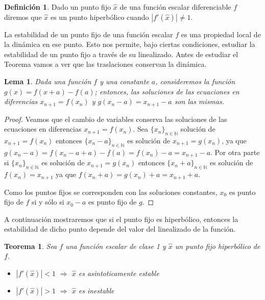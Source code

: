 \documentclass[12pt,a4paper]{report}
\newtheorem{teorema}{Teorema}[section]
\newtheorem{lema}{Lema}[section]
\theoremstyle{definition}
\newtheorem{definicion}{Definición}[section]
\begin{document}
\begin{definicion}

Dado un punto fijo $\hat{x} $ de una función escalar diferenciable $f$ diremos que $\hat{x}$ es un punto hiperbólico cuando $|f'(\hat{x})| \neq 1$.
\end{definicion}

La estabilidad de un punto fijo de una función escalar $f$ es una propiedad local de la dinámica en ese punto. Esto nos permite, bajo ciertas condiciones, estudiar la estabilidad de un punto fijo a través de su linealizado. Antes de estudiar el Teorema vamos a ver que las traslaciones conservan la dinámica.

\begin{lema}
Dada una función $f$ y una constante $a$, consideremos la función $g(x) = f(x + a) - f(a)$; entonces, las soluciones de las ecuaciones en diferencias $x_{n+1} = f(x_n)$ y $g(x_n - a) = x_{n+1} - a$ son las mismas.
    
\end{lema}

\begin{proof}

Veamos que el cambio de variables conserva las soluciones de las ecuaciones en diferencias $x_{n+1} = f(x_n)$. Sea $\{x_n\}_{n\in\mathbb{N}}$ solución de $x_{n+1} = f(x_n)$ entonces $\{x_n-a\}_{n \in \mathbb{N}}$ es solución de $x_{n+1} = g(x_n)$, ya que $g(x_n - a) = f(x_n - a +a) - f(a) = f(x_n) - a = x_{n+1} - a$.
Por otra parte si $\{x_n\}_{n\in\mathbb{N}}$ es solución de $x_{n+1} = g(x_n)$ entonces $\{x_n+a\}_{n \in \mathbb{N}}$ es solución de $f(x_n) = x_{n+1}$ ya que $f(x_n + a) = g(x_n) + a = x_{n+1} + a$.

Como los puntos fijos se corresponden con las soluciones constantes, $x_0$ es punto fijo de $f$ si y sólo si $x_0 -a$ es punto fijo de $g$.
 
\end{proof}

A continuación mostraremos que si el punto fijo es hiperbólico, entonces la estabilidad de dicho punto depende del valor del linealizado de la función.

\begin{teorema}\label{Teorema1.3.1}
Sea $f$ una función escalar de clase 1 y $\hat{x}$ un punto fijo hiperbólico de $f$.
\begin{itemize}
    \item $|f'(\hat{x})| <1$ $\Rightarrow$ $\hat{x}$ es asintoticamente estable 
    \item $|f'(\hat{x})| > 1 $ $\Rightarrow$  $\hat{x}$ es inestable
\end{itemize}
\end{teorema}
\end{document}
